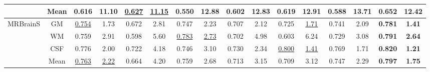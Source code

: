 \documentclass[twocolumn,final,10pt]{elsarticle}
\newcommand\und[1]{\underline{#1}}
\newcommand{\rev}[1]{{\color{black}#1}}
\begin{document}
\begin{table}[h!]
\begin{tabular}{c|c|cccccccccccccc}
\rowcolor{gray!20} & \rev{Mean} & \rev{0.616} & \rev{\textbf{11.10}} & \rev{\und{0.627}} & \rev{\und{11.15}} & \rev{0.550} & \rev{12.88} & \rev{0.602} & \rev{12.83} & \rev{0.619} & \rev{12.91} & \rev{0.588} & \rev{13.71} & \rev{\textbf{0.652}} & \rev{12.42} \\  
\midrule
\multirow{4}{*}{\rev{MRBrainS}} & \rev{GM} & \rev{\und{0.754}} & \rev{1.73} & \rev{0.672} & \rev{2.81} & \rev{0.747} & \rev{2.23} & \rev{0.707} & \rev{2.12} & \rev{0.725} & \rev{\underline{1.71}} & \rev{0.741} & \rev{2.09} & \rev{\textbf{0.781}} & \rev{\textbf{1.41 }}\\ 
& \rev{WM} & \rev{0.759} & \rev{2.91} & \rev{0.598} & \rev{5.60} & \rev{\und{0.783}} & \rev{\underline{2.73}} & \rev{0.702} & \rev{4.98} & \rev{0.603} & \rev{6.24} & \rev{0.729} & \rev{3.08} & \rev{\textbf{0.791}} & \rev{\textbf{2.64}} \\
& \rev{CSF} & \rev{0.776} & \rev{2.00} & \rev{0.722} & \rev{4.18} & \rev{0.746} & \rev{3.10} & \rev{0.730} & \rev{2.34} & \rev{\und{0.800}} & \rev{\und{1.41}} & \rev{0.769} & \rev{1.71} & \rev{\textbf{0.820}} & \rev{\textbf{1.21}} \\ 
\rowcolor{gray!20} & \rev{Mean} & \rev{\und{0.763}} & \rev{\und{2.22}} & \rev{0.664} & \rev{4.20} & \rev{0.759} & \rev{2.68} & \rev{0.713} & \rev{3.15} & \rev{0.709} & \rev{3.12} & \rev{0.747} & \rev{2.29} & \rev{\textbf{0.797}} & \rev{\textbf{1.75}} \\  
\bottomrule
\end{tabular}
\end{table}
\end{document}
